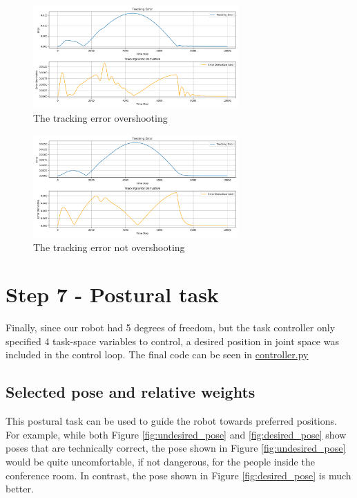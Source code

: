 \documentclass[12pt,a4paper]{article}
\begin{document}
\begin{figure}[htbp]
    \centering
    \includegraphics[width=0.7\textwidth]{images/error_chart_overshoot.png}
    \caption{The tracking error overshooting}
    \label{fig:error_overshoot}
\end{figure}


\begin{figure}[htbp]
    \centering
    \includegraphics[width=0.7\textwidth]{images/error_chart_no_overshoot.png}
    \caption{The tracking error not overshooting}
    \label{fig:error_not_overshoot}
\end{figure}

\section{Step 7 - Postural task}
Finally, since our robot had 5 degrees of freedom, but the task controller only 
specified 4 task-space variables to control, a desired position in joint space was included in
the control loop. The final code can be seen in
\href{https://github.com/lucaSartore/RobotArm/blob/master/src/robot_arm/src/data_processing/controller.py}{controller.py}

\subsection{Selected pose and relative weights}

This postural task can be used to guide the robot towards preferred positions. For example,
while both Figure \ref{fig:undesired_pose} and \ref{fig:desired_pose} show poses that are technically
correct, the pose shown in Figure \ref{fig:undesired_pose} would be quite uncomfortable, if not dangerous,
for the people inside the conference room. In contrast, the pose shown in Figure \ref{fig:desired_pose}
is much better.
\end{document}
